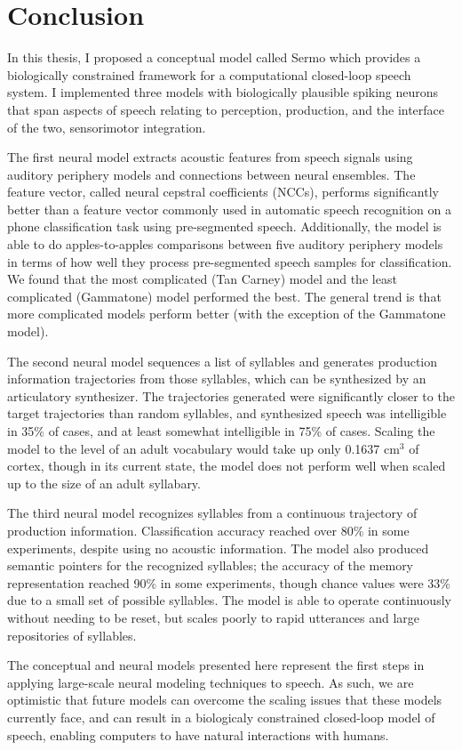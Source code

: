 \chapter{Conclusion}
\label{chapt:conclusion}

In this thesis,
I proposed a conceptual model
called Sermo which
provides a biologically constrained framework
for a computational closed-loop speech system.
I implemented three models
with biologically plausible spiking neurons
that span aspects of speech
relating to perception, production,
and the interface of the two,
sensorimotor integration.

The first neural model
extracts acoustic features
from speech signals
using auditory periphery models
and connections between neural ensembles.
The feature vector,
called neural cepstral coefficients (NCCs),
performs significantly better than
a feature vector commonly used
in automatic speech recognition
on a phone classification task
using pre-segmented speech.
Additionally, the model is able
to do apples-to-apples comparisons
between five auditory periphery models
in terms of how well they
process pre-segmented speech samples
for classification.
We found that the
most complicated (Tan Carney) model
and the least complicated (Gammatone) model
performed the best.
The general trend is that
more complicated models
perform better
(with the exception of the Gammatone model).

The second neural model
sequences a list of syllables
and generates production information trajectories
from those syllables,
which can be synthesized by an articulatory synthesizer.
The trajectories generated were
significantly closer
to the target trajectories than
random syllables,
and synthesized speech was intelligible
in 35\% of cases,
and at least somewhat intelligible in 75\% of cases.
Scaling the model to the level of
an adult vocabulary would take up
only 0.1637 cm$^3$ of cortex,
though in its current state,
the model does not perform well
when scaled up
to the size of an adult syllabary.

The third neural model
recognizes syllables from a continuous
trajectory of production information.
Classification accuracy reached
over 80\% in some experiments,
despite using no acoustic information.
The model also produced semantic pointers
for the recognized syllables;
the accuracy of the memory representation
reached 90\% in some experiments,
though chance values were 33\% due to
a small set of possible syllables.
The model is able to operate continuously
without needing to be reset,
but scales poorly to rapid utterances
and large repositories of syllables.

The conceptual and neural models
presented here
represent the first steps
in applying large-scale neural modeling techniques
to speech.
As such, we are optimistic that
future models can overcome
the scaling issues that these models
currently face,
and can result in a biologicaly constrained
closed-loop model of speech,
enabling computers to
have natural interactions with humans.
